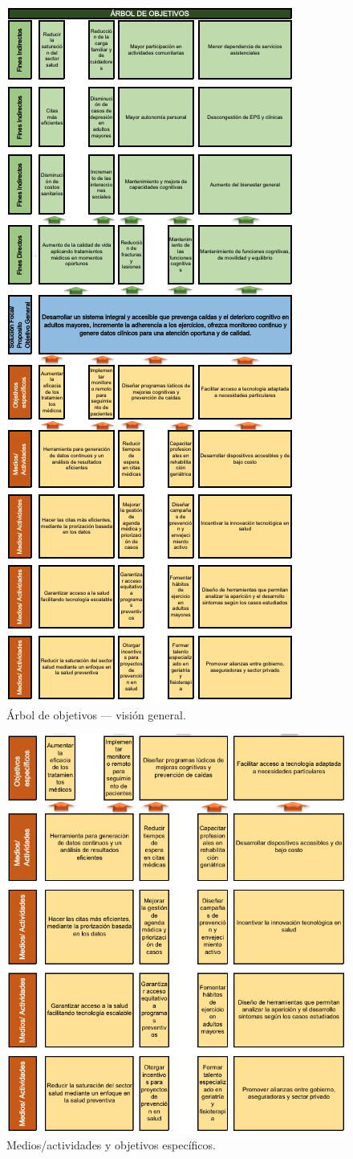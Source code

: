 \begin{figure}[H]\centering
\includegraphics[width=.35\linewidth]{Figures/Arbol_Objetivos/00_arbol_objetivos_general.png}
\caption{Árbol de objetivos — visión general.}
\end{figure}

\begin{figure}[H]\centering
\includegraphics[width=.95\linewidth]{Figures/Arbol_Objetivos/01_medios_y_objetivos_especificos.png}
\caption{Medios/actividades y objetivos específicos.}
\end{figure}

